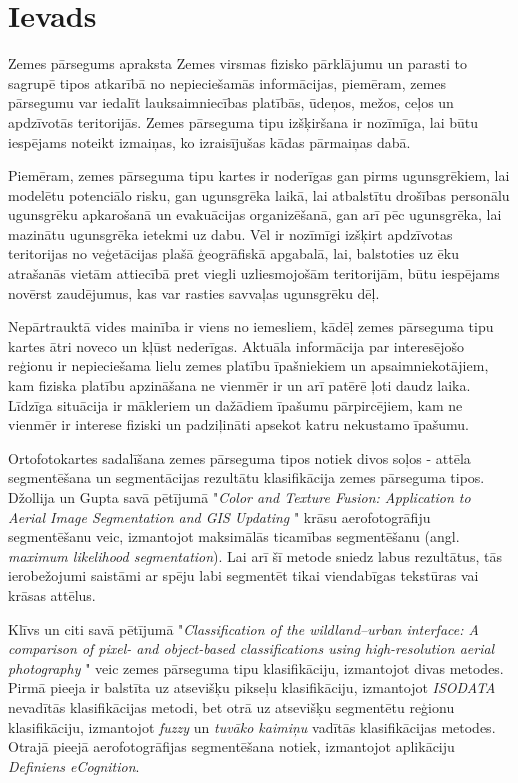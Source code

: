 \documentclass[12pt,paper=a4]{report}
\begin{document}
\chapter*{Ievads}
Zemes pārsegums apraksta Zemes virsmas fizisko pārklājumu un parasti to sagrupē tipos atkarībā no  nepieciešamās informācijas, piemēram, zemes pārsegumu var iedalīt lauksaimniecības platībās, ūdeņos, mežos, ceļos un apdzīvotās teritorijās. Zemes pārseguma tipu izšķiršana ir nozīmīga, lai būtu iespējams noteikt izmaiņas, ko izraisījušas kādas pārmaiņas dabā. \cite{landCoverTypes1976}\par 
Piemēram, zemes pārseguma tipu kartes ir noderīgas gan pirms ugunsgrēkiem, lai modelētu potenciālo risku, gan ugunsgrēka laikā, lai atbalstītu drošības personālu ugunsgrēku apkarošanā un evakuācijas organizēšanā, gan arī pēc ugunsgrēka, lai mazinātu ugunsgrēka ietekmi uz dabu. Vēl ir nozīmīgi izšķirt apdzīvotas teritorijas no veģetācijas plašā ģeogrāfiskā apgabalā, lai, balstoties uz ēku atrašanās vietām attiecībā pret viegli uzliesmojošām teritorijām, būtu iespējams novērst zaudējumus, kas var rasties savvaļas ugunsgrēku dēļ. \cite{cleve2008classification}\par
Nepārtrauktā vides mainība ir viens no iemesliem, kādēļ zemes pārseguma tipu kartes ātri noveco un kļūst nederīgas. Aktuāla informācija par interesējošo reģionu ir nepieciešama lielu zemes platību īpašniekiem un apsaimniekotājiem, kam fiziska platību apzināšana ne vienmēr ir un arī patērē ļoti daudz laika. Līdzīga situācija ir mākleriem un dažādiem īpašumu pārpircējiem, kam ne vienmēr ir interese fiziski un padziļināti apsekot katru nekustamo īpašumu. \par
Ortofotokartes sadalīšana zemes pārseguma tipos notiek divos soļos - attēla segmentēšana un segmentācijas rezultātu klasifikācija zemes pārseguma tipos. Džollija un Gupta savā pētījumā "\textit{Color and Texture Fusion: Application to Aerial Image Segmentation and GIS Updating} \cite{jolly1996color}" krāsu aerofotogrāfiju segmentēšanu veic, izmantojot maksimālās ticamības segmentēšanu (angl. \textit{maximum likelihood segmentation}). Lai arī šī metode sniedz labus rezultātus, tās ierobežojumi saistāmi ar spēju labi segmentēt tikai viendabīgas tekstūras vai krāsas attēlus. \cite{jolly1996color} \par
Klīvs un citi savā pētījumā "\textit{Classification of the wildland–urban interface: A comparison of pixel- and object-based classifications using high-resolution aerial photography} \cite{cleve2008classification}" veic zemes pārseguma tipu klasifikāciju, izmantojot divas metodes. Pirmā pieeja ir balstīta uz atsevišķu pikseļu klasifikāciju, izmantojot \textit{ISODATA} nevadītās klasifikācijas metodi, bet otrā uz atsevišķu segmentētu reģionu klasifikāciju, izmantojot \textit{fuzzy} un \textit{tuvāko kaimiņu} vadītās klasifikācijas metodes. Otrajā pieejā aerofotogrāfijas segmentēšana notiek, izmantojot aplikāciju \textit{Definiens eCognition}. \cite{cleve2008classification} \par
\end{document}
